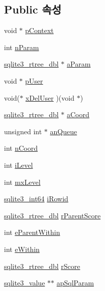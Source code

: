 \subsection*{Public 속성}
\begin{DoxyCompactItemize}
\item 
void $\ast$ \hyperlink{structsqlite3__rtree__query__info_a21e4964ceeddedce2211c8a75067936d}{p\+Context}
\item 
int \hyperlink{structsqlite3__rtree__query__info_a9df4acb109f572455c8e2fb443027157}{n\+Param}
\item 
\hyperlink{sqlite3_8h_ae9156ff58620c1ceae9391f1afabae1b}{sqlite3\+\_\+rtree\+\_\+dbl} $\ast$ \hyperlink{structsqlite3__rtree__query__info_a61352eac82151fee3e4c7ff718612179}{a\+Param}
\item 
void $\ast$ \hyperlink{structsqlite3__rtree__query__info_a7c1d4f1f20c14b88c4dc02643e6706a0}{p\+User}
\item 
void($\ast$ \hyperlink{structsqlite3__rtree__query__info_a23bcc6df883995d42d65449a27f45f85}{x\+Del\+User} )(void $\ast$)
\item 
\hyperlink{sqlite3_8h_ae9156ff58620c1ceae9391f1afabae1b}{sqlite3\+\_\+rtree\+\_\+dbl} $\ast$ \hyperlink{structsqlite3__rtree__query__info_a9d6e605e62fcf49d57dfc0d192076542}{a\+Coord}
\item 
unsigned int $\ast$ \hyperlink{structsqlite3__rtree__query__info_ace9f952557eb7b0e050d879ebb80905a}{an\+Queue}
\item 
int \hyperlink{structsqlite3__rtree__query__info_aa4b95a36fe7306e17e8cf9329fcb0964}{n\+Coord}
\item 
int \hyperlink{structsqlite3__rtree__query__info_af91ca2d5f867b3b0aa9c91920a3b5b45}{i\+Level}
\item 
int \hyperlink{structsqlite3__rtree__query__info_ac84533734fb4c86c3f2deba904118785}{mx\+Level}
\item 
\hyperlink{sqlite3_8h_a0a4d3e6c1ad46f90e746b920ab6ca0d2}{sqlite3\+\_\+int64} \hyperlink{structsqlite3__rtree__query__info_a9e43489993c8aeace851f86eaa00ec26}{i\+Rowid}
\item 
\hyperlink{sqlite3_8h_ae9156ff58620c1ceae9391f1afabae1b}{sqlite3\+\_\+rtree\+\_\+dbl} \hyperlink{structsqlite3__rtree__query__info_af7da93e7fc405eec7e7ec90ab237eab2}{r\+Parent\+Score}
\item 
int \hyperlink{structsqlite3__rtree__query__info_a8bd37c6af5427c35830f674a4db682c3}{e\+Parent\+Within}
\item 
int \hyperlink{structsqlite3__rtree__query__info_ad1038309f7ea55472a7ff99bf4f9d514}{e\+Within}
\item 
\hyperlink{sqlite3_8h_ae9156ff58620c1ceae9391f1afabae1b}{sqlite3\+\_\+rtree\+\_\+dbl} \hyperlink{structsqlite3__rtree__query__info_af449e4a3607573d17b3d31c67b6e1584}{r\+Score}
\item 
\hyperlink{sqlite3_8h_ac2fa1ecdb2290d9af6010edbd1cbc83c}{sqlite3\+\_\+value} $\ast$$\ast$ \hyperlink{structsqlite3__rtree__query__info_a57ccb3cce45dd946e5184b5addeb0326}{ap\+Sql\+Param}
\end{DoxyCompactItemize}


